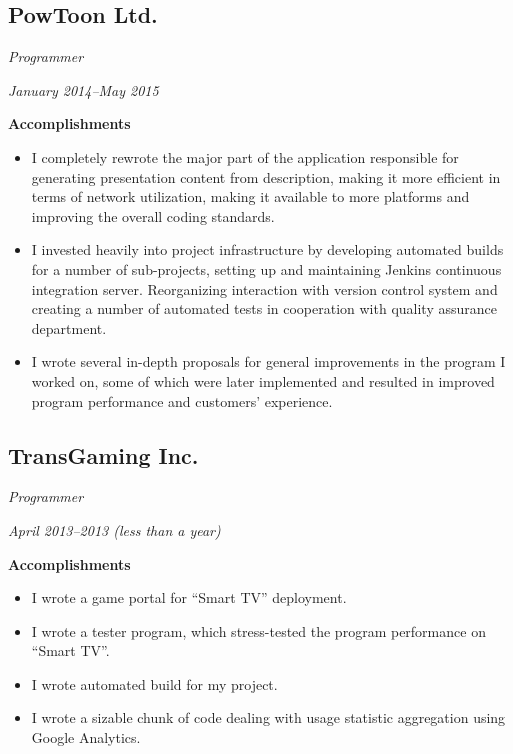 \documentclass[11pt]{article}
\begin{document}
\subsection{PowToon Ltd.}
\label{sec:orgheadline10}
\begin{description}
\item[{Position}] \emph{Programmer}
\item[{Term}] \emph{January 2014--May 2015}
\item \textbf{Accomplishments}
\begin{itemize}
\item I completely rewrote the major part of the application responsible
for generating presentation content from description, making it
more efficient in terms of network utilization, making it available
to more platforms and improving the overall coding standards.
\item I invested heavily into project infrastructure by developing automated
builds for a number of sub-projects, setting up and maintaining Jenkins
continuous integration server.  Reorganizing interaction with version
control system and creating a number of automated tests in cooperation
with quality assurance department.
\item I wrote several in-depth proposals for general improvements in the
program I worked on, some of which were later implemented and resulted
in improved program performance and customers' experience.
\end{itemize}
\end{description}

\subsection{TransGaming Inc.}
\label{sec:orgheadline11}
\begin{description}
\item[{Position}] \emph{Programmer}
\item[{Term}] \emph{April 2013--2013 (less than a year)}
\item \textbf{Accomplishments}
\begin{itemize}
\item I wrote a game portal for ``Smart TV'' deployment.
\item I wrote a tester program, which stress-tested the program performance
on ``Smart TV''.
\item I wrote automated build for my project.
\item I wrote a sizable chunk of code dealing with usage statistic aggregation
using Google Analytics.
\end{itemize}
\end{description}
\end{document}
